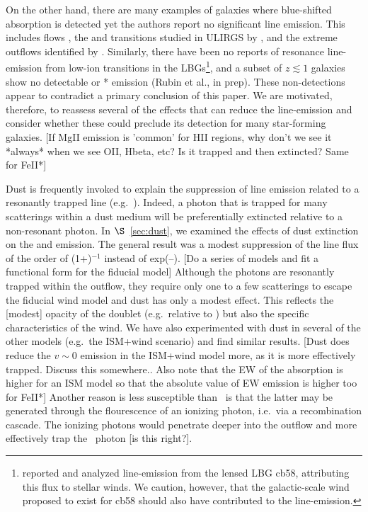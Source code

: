 \documentclass[12pt,preprint]{aastex}
\begin{document}
On the other hand,
there are many examples of galaxies where blue-shifted absorption is
detected yet the authors report no significant line emission.  This
includes  flows \cite{rupke,martin,sato}, 
the  and  transitions studied in
ULIRGS by \cite{mb10}, and the extreme  outflows identified
by \cite{tremonti}.  Similarly, there have been no reports of
resonance line-emission from low-ion transitions in the LBGs\footnote{\citet{pettini02}
  reported and analyzed  line-emission from the lensed LBG
  cb58, attributing this flux to stellar winds.  We caution, however,
  that the galactic-scale wind proposed to exist for cb58 should also
  have contributed to the  line-emission.}, and a subset of
$z \lesssim 1$ galaxies show no detectable  or *
emission (Rubin et al., in prep). 
These non-detections appear to contradict a primary conclusion of 
this paper.   We are motivated, therefore, to
reassess several of the effects that can reduce the line-emission
and consider whether these could preclude its detection for many
star-forming galaxies.  [If MgII emission is 'common' for HII regions,
why don't we see it *always* when we see OII, Hbeta, etc? Is it
trapped and then extincted? Same for FeII*]


Dust is frequently invoked to explain the suppression of line emission
related to a resonantly trapped line (e.g.\ \lya).  Indeed, a photon
that is trapped for many scatterings within a dust medium will be
preferentially extincted relative to a non-resonant photon.  In
$\S$~\ref{sec:dust}, we examined the effects of dust extinction on the
 and  emission.  The general result was a modest
suppression of the line flux of the order of (1+\taud)$^{-1}$ instead of
exp(--\taud).   [Do a series of models and fit a functional form for
the fiducial model]  Although the  photons are resonantly
trapped within the outflow, they require only one to a few scatterings
to escape the fiducial wind model and dust has only a
modest effect.  This reflects the [modest] opacity of the 
doublet (e.g.\ relative to \lya) but also the specific characteristics
of the wind.  We have also experimented with dust in several of the
other models (e.g.\ the ISM+wind scenario) and find similar results.
[Dust does reduce the $v \sim 0$ emission in the ISM+wind model more,
as it is more effectively trapped.  Discuss this somewhere..  Also
note that the EW of the absorption is higher for an ISM model so that
the absolute value of EW emission is higher too for FeII*]
Another reason  is less susceptible than \lya\ is that the
latter may be generated through the flourescence of an ionizing
photon, i.e.\ via a recombination cascade.  The ionizing photons 
would penetrate deeper into the outflow and more effectively trap the
\lya\ photon [is this right?].  
\end{document}
